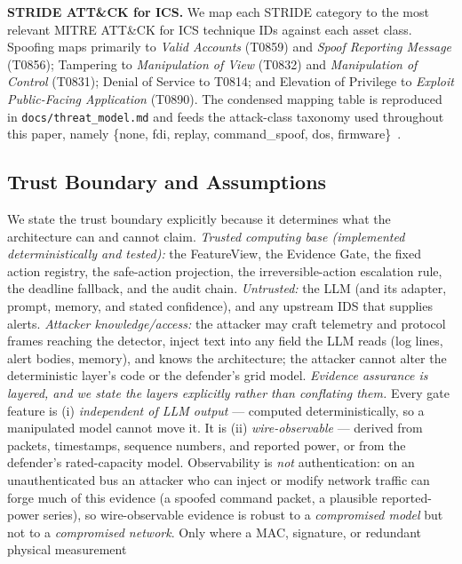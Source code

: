 \textbf{STRIDE \texttimes{} {ATT\&CK} for ICS.} We map each STRIDE category
to the most relevant MITRE ATT\&CK for ICS technique IDs against each asset
class. Spoofing maps primarily to \emph{Valid Accounts} (T0859) and
\emph{Spoof Reporting Message} (T0856); Tampering to \emph{Manipulation of
View} (T0832) and \emph{Manipulation of Control} (T0831); Denial of Service
to T0814; and Elevation of Privilege to \emph{Exploit Public-Facing
Application} (T0890). The condensed mapping table is reproduced in
\texttt{docs/threat\_model.md} and feeds the attack-class taxonomy used
throughout this paper, namely \{\textsf{none}, \textsf{fdi}, \textsf{replay},
\textsf{command\_spoof}, \textsf{dos},
\textsf{firmware}\}~\cite{Zografopoulos2023_DER_CybersecurityOutlook,Hasan2024_ML_SG_CPS,Aslam2025_AI_ICS}.

\subsection{Trust Boundary and Assumptions}
\label{sec:bg-trust}
We state the trust boundary explicitly because it determines what the
architecture can and cannot claim.
\emph{Trusted computing base (implemented deterministically and tested):} the
FeatureView, the Evidence Gate, the fixed action registry, the safe-action
projection,
the irreversible-action escalation rule, the deadline fallback, and the
audit chain. \emph{Untrusted:} the LLM (and its adapter, prompt, memory,
and stated confidence), and any upstream IDS that supplies alerts.
\emph{Attacker knowledge/access:} the attacker may craft telemetry and
protocol frames reaching the detector, inject text into any field the LLM
reads (log lines, alert bodies, memory), and knows the architecture; the
attacker cannot alter the deterministic layer's code or the defender's
grid model. \emph{Evidence assurance is layered, and we state the layers
explicitly rather than conflating them.} Every gate feature is (i)
\emph{independent of LLM output} --- computed deterministically, so a
manipulated model cannot move it. It is (ii) \emph{wire-observable} ---
derived from packets, timestamps, sequence numbers, and reported power, or
from the defender's rated-capacity model. Observability is \emph{not}
authentication: on an unauthenticated bus an attacker who can inject or
modify network traffic can forge much of this evidence (a spoofed command
packet, a plausible reported-power series), so wire-observable evidence is
robust to a \emph{compromised model} but not to a \emph{compromised
network}. Only where a MAC, signature, or redundant physical measurement
